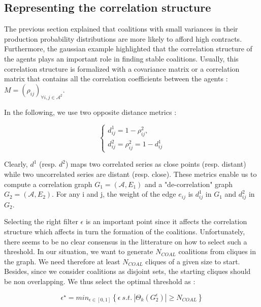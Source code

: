 \documentclass[conference]{IEEEtran}
\begin{document}
\subsection{Representing the correlation structure}

The previous section explained that coalitions with small variances in their production probability distributions are more likely to afford high contracts. Furthermore, the gaussian example highlighted that the correlation structure of the agents plays an important role in finding stable coalitions. Usually, this correlation structure is formalized with a covariance matrix or a correlation matrix that contains all the correlation coefficients between the agents : $ M = (\rho_{ij})_{\forall i,j \in \mathcal{A}^{2}}$.

In the following, we use two opposite distance metrics : 

\begin{equation}
\left\{ \begin{array}{lll}
			d_{ij}^{1} = 1 - \rho_{ij}^{2}, \\
			d_{ij}^{2} = \rho_{ij}^{2} = 1 - d_{ij}^{1}
\end{array} \right.
\end{equation}

Clearly, $ d^{1} $ (resp. $ d^{2} $) maps two correlated series as close points (resp. distant) while two uncorrelated series are distant (resp. close). These metrics enable us to compute a correlation graph $ G_{1} = (\mathcal{A}, E_{1}) $ and a "de-correlation" graph $ G_{2} = (\mathcal{A}, E_{2} ) $. For any i and j, the weight of the edge $ e_{ij} $ is $ d_{ij}^{1} $ in $ G_{1} $ and $ d_{ij}^{2} $ in $ G_{2} $.

Selecting the right filter $ \epsilon $ is an important point since it affects the correlation structure which affects in turn the formation of the coalitions. Unfortunately, there seems to be no clear consensus in the litterature on how to select such a threshold. In our situation, we want to generate $ N_{COAL} $ coalitions from cliques in the graph. We need therefore at least $ N_{COAL} $ cliques of a given size to start. Besides, since we consider coalitions as disjoint sets, the starting cliques should be non overlapping. We thus select the optimal threshold as :

\begin{equation}
\label{epsilon_star}
\epsilon^{\star} = min_{ \epsilon \in [0,1]} \left\{ \epsilon\ s.t.\ |\Theta_{k}(G_{2}^{\epsilon})| \geq N_{COAL} \right\}
\end{equation} 
\end{document}
